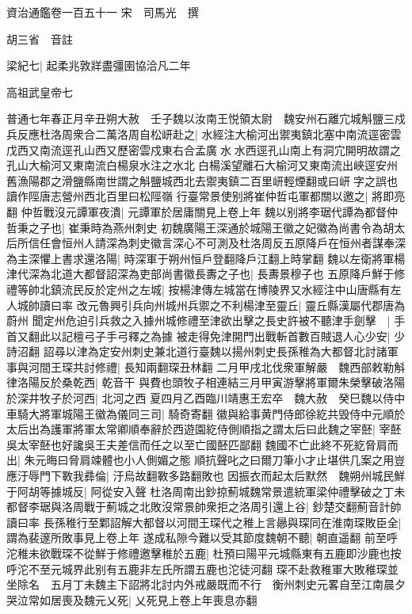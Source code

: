 資治通鑑卷一百五十一
宋　司馬光　撰

胡三省　音註

梁紀七|{
	起柔兆敦牂盡彊圉協洽凡二年}


高祖武皇帝七

普通七年春正月辛丑朔大赦　壬子魏以汝南王悦領太尉　魏安州石離宂城斛鹽三戍兵反應杜洛周衆合二萬洛周自松岍赴之|{
	水經注大榆河出禦夷鎮北塞中南流逕密雲戊西又南流逕孔山西又歷密雲戍東右合孟廣水水西逕孔山南上有洞宂開明故謂之孔山大榆河又東南流白楊泉水注之水北白楊溪望離石大榆河又東南流出峽逕安州舊漁陽郡之滑鹽縣南世謂之斛鹽城西北去禦夷鎮二百里岍輕煙翻或曰岍字之誤也讀作陘唐志營州西北百里曰松陘嶺}
行臺常景使别將崔仲哲屯軍都關以邀之|{
	將即亮翻}
仲哲戰沒元譚軍夜潰|{
	元譚軍於居庸關見上卷上年}
魏以别將李琚代譚為都督仲哲秉之子也|{
	崔秉時為燕州刺史}
初魏廣陽王深通於城陽王徽之妃徽為尚書令為胡太后所信任會恒州人請深為刺史徽言深心不可測及杜洛周反五原降戶在恒州者謀奉深為主深懼上書求還洛陽|{
	時深軍于朔州恒戶登翻降戶江翻上時掌翻}
魏以左衛將軍楊津代深為北道大都督詔深為吏部尚書徽長夀之子也|{
	長夀景穆子也}
五原降戶鮮于修禮等帥北鎮流民反於定州之左城|{
	按楊津傳左城當在博陵界又水經注中山唐縣有左人城帥讀曰率}
改元魯興引兵向州城州兵禦之不利楊津至靈丘|{
	靈丘縣漢屬代郡唐為蔚州}
聞定州危迫引兵救之入據州城修禮至津欲出擊之長史許被不聽津手劍擊　|{
	手首又翻此以記檀弓子手弓釋之為據}
被走得免津開門出戰斬首數百賊退人心少安|{
	少詩沼翻}
詔尋以津為定安州刺史兼北道行臺魏以揚州刺史長孫稚為大都督北討諸軍事與河間王琛共討修禮|{
	長知兩翻琛丑林翻}
二月甲戌北伐衆軍解嚴　魏西部敕勒斛律洛陽反於桑乾西|{
	乾音干}
與費也頭牧子相連結三月甲寅游擊將軍爾朱榮擊破洛陽於深井牧子於河西|{
	北河之西}
夏四月乙酉臨川靖惠王宏卒　魏大赦　癸巳魏以侍中車騎大將軍城陽王徽為儀同三司|{
	騎奇寄翻}
徽與給事黄門侍郎徐紇共毁侍中元順於太后出為護軍將軍太常卿順奉辭於西遊園紇侍側順指之謂太后曰此魏之宰噽|{
	宰噽吳太宰噽也好讒吳王夫差信而任之以至亡國噽匹鄙翻}
魏國不亡此終不死紇脅肩而出|{
	朱元晦曰脅肩竦體也小人側媚之態}
順抗聲叱之曰爾刀筆小才止堪供几案之用豈應汙辱門下斁我彞倫|{
	汙烏故翻斁多路翻敗也}
因振衣而起太后默然　魏朔州城民鮮于阿胡等據城反|{
	阿從安入聲}
杜洛周南出鈔掠薊城魏常景遣統軍梁仲禮擊破之丁未都督李琚與洛周戰于薊城之北敗沒常景帥衆拒之洛周引還上谷|{
	鈔楚交翻薊音計帥讀曰率}
長孫稚行至鄴詔解大都督以河間王琛代之稚上言曏與琛同在淮南琛敗臣全|{
	謂為裴邃所敗事見上卷上年}
遂成私隙今難以受其節度魏朝不聽|{
	朝直遥翻}
前至呼沱稚未欲戰琛不從鮮于修禮邀擊稚於五鹿|{
	杜預曰陽平元城縣東有五鹿即沙鹿也按呼沱不至元城界此别有五鹿非左氏所謂五鹿也沱徒河翻}
琛不赴救稚軍大敗稚琛並坐除名　五月丁未魏主下詔將北討内外戒嚴既而不行　衡州刺史元畧自至江南晨夕哭泣常如居喪及魏元乂死|{
	乂死見上卷上年喪息亦翻}
